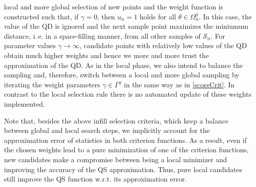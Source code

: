 \documentclass[article, nojss]{jss}
\numberwithin{equation}{section}			%
\newcommand{\Sample}{\mathcal{S}}
\begin{document}
local and more global selection of new points and the weight function is
constructed such that, if $\gamma=0$, then $u_n=1$ holds for all $\theta\in\Omega^g_n$.
In this case, the value of the QD is ignored and the next sample point maximizes
the miniumum distance, i.\,e. in a space-filling manner, from all other samples
of $\Sample_n$. For parameter values $\gamma\rightarrow\infty$, candidate points with relatively
low values of the QD obtain much higher weights and hence we more and more trust the
approximation of the QD. As in the local phase, we also intend to balance the
sampling and, therefore, switch between a local and more global sampling by
iterating the weight parameters $\gamma\in\Gamma^g$ in the same way as in
\eqref{scoreCrit}. In contrast to the local selection rule there is no automated
update of these weights implemented.\par
%
Note that, besides the above infill selection criteria, which keep a
balance between global and local search steps, we implicitly account for the
approximation error of statistics in both criterion functions. As a result, even
if the chosen weights lead to a pure minimization of one of the criterion functions, new candidates
make a compromise between being a local minimizer and improving the accuracy of
the QS approximation. Thus, pure local candidates still improve the QS function w.r.t. its approximation error.
%
\end{document}
